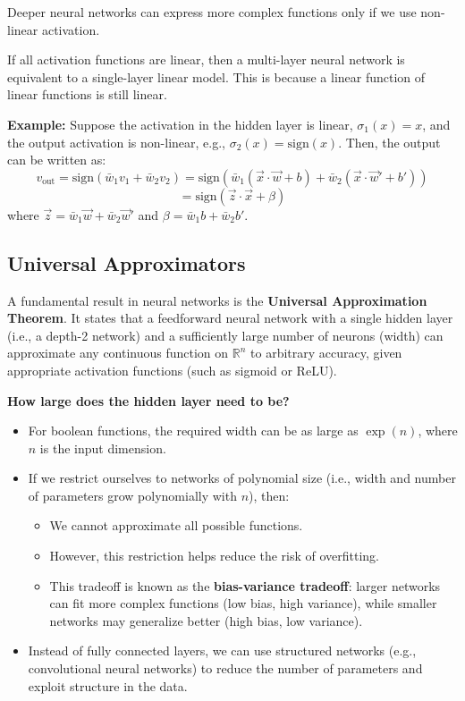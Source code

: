 Deeper neural networks can express more complex functions only if we use non-linear activation.

If all activation functions are linear, then a multi-layer neural network is equivalent to a single-layer linear model. This is because a linear function of linear functions is still linear.

\textbf{Example:} Suppose the activation in the hidden layer is linear, $\sigma_1(x) = x$, and the output activation is non-linear, e.g., $\sigma_2(x) = \mathrm{sign}(x)$. Then, the output can be written as:
\[
v_{\text{out}} = \mathrm{sign}(\bar{w}_1 v_1 + \bar{w}_2 v_2) = \mathrm{sign}\left(\bar{w}_1(\vec{x} \cdot \vec{w} + b) + \bar{w}_2(\vec{x} \cdot \vec{w}' + b')\right)
\]
\[
= \mathrm{sign}(\vec{z} \cdot \vec{x} + \beta)
\]
where $\vec{z} = \bar{w}_1 \vec{w} + \bar{w}_2 \vec{w}'$ and $\beta = \bar{w}_1 b + \bar{w}_2 b'$.



\subsection{Universal Approximators}

A fundamental result in neural networks is the \textbf{Universal Approximation Theorem}. It states that a feedforward neural network with a single hidden layer (i.e., a depth-2 network) and a sufficiently large number of neurons (width) can approximate any continuous function on $\mathbb{R}^n$ to arbitrary accuracy, given appropriate activation functions (such as sigmoid or ReLU).

\textbf{How large does the hidden layer need to be?}
\begin{itemize}
    \item For boolean functions, the required width can be as large as $\exp(n)$, where $n$ is the input dimension.
    \item If we restrict ourselves to networks of polynomial size (i.e., width and number of parameters grow polynomially with $n$), then:
    \begin{itemize}
        \item We cannot approximate all possible functions.
        \item However, this restriction helps reduce the risk of overfitting.
        \item This tradeoff is known as the \textbf{bias-variance tradeoff}: larger networks can fit more complex functions (low bias, high variance), while smaller networks may generalize better (high bias, low variance).
    \end{itemize}
    \item Instead of fully connected layers, we can use structured networks (e.g., convolutional neural networks) to reduce the number of parameters and exploit structure in the data.
\end{itemize}
